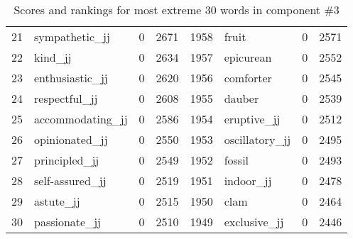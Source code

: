 \begin{table}[tbp]
\begin{tabular}{| rlr@{.}l | rlr@{.}l |}
    21 & sympathetic\_jj & 0 & 2671    &    1958 & fruit & 0 & 2571 \\
    22 & kind\_jj & 0 & 2634    &    1957 & epicurean & 0 & 2552 \\
    23 & enthusiastic\_jj & 0 & 2620    &    1956 & comforter & 0 & 2545 \\
    24 & respectful\_jj & 0 & 2608    &    1955 & dauber & 0 & 2539 \\
    25 & accommodating\_jj & 0 & 2586    &    1954 & eruptive\_jj & 0 & 2512 \\
    26 & opinionated\_jj & 0 & 2550    &    1953 & oscillatory\_jj & 0 & 2495 \\
    27 & principled\_jj & 0 & 2549    &    1952 & fossil & 0 & 2493 \\
    28 & self-assured\_jj & 0 & 2519    &    1951 & indoor\_jj & 0 & 2478 \\
    29 & astute\_jj & 0 & 2515    &    1950 & clam & 0 & 2464 \\
    30 & passionate\_jj & 0 & 2510    &    1949 & exclusive\_jj & 0 & 2446 \\
    \hline
    \end{tabular}
    \caption{Scores and rankings for most extreme 30 words in component \#3} 
\end{table}
\clearpage
